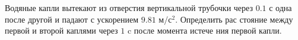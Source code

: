Водяные капли вытекают из отверстия вертикальной трубочки через $0.1$ с
одна после другой и падают с ускорением $9.81$ м/с$^2$. Определить рас
стояние между первой и второй каплями через $1$ c после момента истече
ния первой капли.
